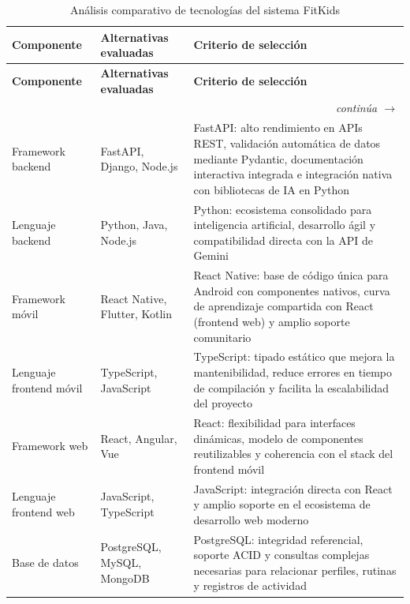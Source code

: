 					\begingroup
					\setlength{\LTpre}{6pt}\setlength{\LTpost}{2pt}
					\renewcommand{\arraystretch}{1.15}
					\small
					\begin{longtable}{p{4.5cm}p{4cm}p{5cm}}
						\caption{Análisis comparativo de tecnologías del sistema FitKids}\label{tab:analisis_tecnologico}\\
						\hline
						\textbf{Componente} & \textbf{Alternativas evaluadas} & \textbf{Criterio de selección}\\
						\hline
						\endfirsthead
						\hline
						\textbf{Componente} & \textbf{Alternativas evaluadas} & \textbf{Criterio de selección}\\
						\hline
						\endhead
						\hline\multicolumn{3}{r}{\footnotesize\itshape continúa $\rightarrow$}\\
						\endfoot
						\hline
						\endlastfoot
						Framework backend & FastAPI, Django, Node.js & FastAPI: alto rendimiento en APIs REST, validación automática de datos mediante Pydantic, documentación interactiva integrada e integración nativa con bibliotecas de IA en Python~\cite{Kleppmann2017}\\
						Lenguaje backend & Python, Java, Node.js & Python: ecosistema consolidado para inteligencia artificial, desarrollo ágil y compatibilidad directa con la API de Gemini~\cite{Sengar2024}\\
						Framework móvil & React Native, Flutter, Kotlin & React Native: base de código única para Android con componentes nativos, curva de aprendizaje compartida con React (frontend web) y amplio soporte comunitario~\cite{Kleppmann2017}\\
						Lenguaje frontend móvil & TypeScript, JavaScript & TypeScript: tipado estático que mejora la mantenibilidad, reduce errores en tiempo de compilación y facilita la escalabilidad del proyecto~\cite{Fowler2002}\\
						Framework web & React, Angular, Vue & React: flexibilidad para interfaces dinámicas, modelo de componentes reutilizables y coherencia con el stack del frontend móvil~\cite{Kleppmann2017}\\
						Lenguaje frontend web & JavaScript, TypeScript & JavaScript: integración directa con React y amplio soporte en el ecosistema de desarrollo web moderno\\
						Base de datos & PostgreSQL, MySQL, MongoDB & PostgreSQL: integridad referencial, soporte ACID y consultas complejas necesarias para relacionar perfiles, rutinas y registros de actividad~\cite{Kleppmann2017}\\

\end{longtable}
